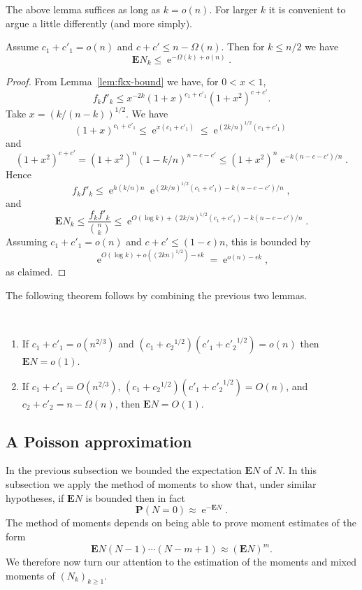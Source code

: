 \documentclass[ALCO,ThmDefs,Unicode,epreuves]{cedram}
\DeclareMathOperator{\expe}{e}
\newcommand{\eps}{\epsilon}
\renewcommand\P{\mathbf{P}}
\newcommand\E{\mathbf{E}}
\begin{document}
The above lemma suffices as long as $k = o(n)$. For larger $k$ it is convenient to argue a little differently (and more simply).

\begin{lemma} \label{lem:Nk-bound-large-k}
Assume $c_1 + c'_1 = o(n)$ and $c+c' \leq n - \Omega(n)$. Then for $k\leq n/2$ we have
\[
 \E N_k \leq \expe^{-\Omega(k) + o(n)}.
\]
\end{lemma}
\begin{proof}
From Lemma~\ref{lem:fkx-bound} we have, for $0 < x < 1$,
\[
 f_k f'_k \leq x^{-2k} (1+x)^{c_1 + c'_1} (1+x^2)^{c + c'}.
\]
Take $x = (k/(n-k))^{1/2}$. We have
\[
 (1+x)^{c_1 + c'_1} \leq \expe^{x(c_1 + c'_1)} \leq \expe^{(2k/n)^{1/2} (c_1 + c'_1)}
\]
and
\[
 (1+x^2)^{c+c'} = (1+x^2)^n (1-k/n)^{n - c - c'} \leq (1+x^2)^n \expe^{-k(n - c- c')/n}.
\]
Hence
\[
 f_k f'_k \leq \expe^{h(k/n)n} \expe^{(2k/n)^{1/2}(c_1 + c'_1) - k(n-c-c')/n},
\]
and
\[
 \E N_k \leq \frac{f_k f'_k}{\binom{n}{k}} \leq \expe^{O(\log k) + (2k/n)^{1/2} (c_1 + c'_1) - k(n-c-c')/n}.
\]
Assuming $c_1+c'_1 = o(n)$ and $c + c' \leq (1-\eps) n$, this is bounded by
\[
 \expe^{O(\log k) + o((2k n)^{1/2}) - \eps k} = \expe^{o(n) - \eps k},
\]
as claimed.
\end{proof}

The following theorem follows by combining the previous two lemmas.

\begin{theorem} \label{thm:main-ENk-bound}
$\ $
\begin{enumerate}
 \item If $c_1 + c'_1 = o(n^{2/3})$ and $(c_1 + {c_2}^{1/2}) (c'_1 + {c'_2}^{1/2}) = o(n)$ then $\E N = o(1)$.
 \item If $c_1 + c'_1 = O(n^{2/3})$, $(c_1 + {c_2}^{1/2}) (c'_1 + {c'_2}^{1/2}) = O(n)$, and $c_2 + c'_2 = n - \Omega(n)$, then $\E N = O(1)$.
\end{enumerate}
\end{theorem}

\subsection{A Poisson approximation} \label{subsec:possion}

In the previous subsection we bounded the expectation $\E N$ of $N$. In this subsection we apply the method of moments to show that, under similar hypotheses, if $\E N$ is bounded then in fact
\[
 \P(N = 0) \approx \expe^{-\E N}.
\]
The method of moments depends on being able to prove moment estimates of the form
\[
 \E N(N-1) \cdots (N-m+1) \approx (\E N)^m.
\]
We therefore now turn our attention to the estimation of the moments and mixed moments of $(N_k)_{k\geq 1}$.
\end{document}
